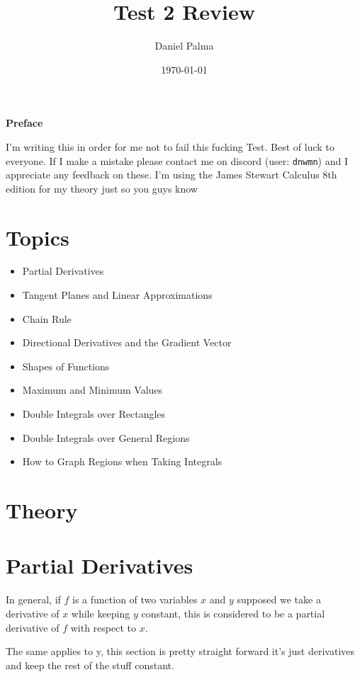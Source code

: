 \documentclass{article}
\author{Daniel Palma}
\date{\today}
\title{Test 2 Review}
\newcommand{\prefacename}{Preface}
\newenvironment{preface}{
    \vspace*{\stretch{2}}
    {\noindent \bfseries \Huge \prefacename}
    \begin{center}
        \thispagestyle{plain}
    \end{center}%
}
{\vspace*{\stretch{5}}}
\begin{document}
\maketitle
\newpage

\begin{preface}
    I'm writing this in order for me not to fail this fucking Test.
    Best of luck to everyone. If I make a mistake please contact me on discord (user: \verb|dnwmn|) and I appreciate any feedback on these. I'm using the James Stewart Calculus 8th edition for my theory just so you guys know 
\end{preface}

\tableofcontents
\newpage



\section*{Topics}

\begin{itemize}
    \item Partial Derivatives
    \item Tangent Planes and Linear Approximations
    \item Chain Rule
    \item Directional Derivatives and the Gradient Vector
    \item Shapes of Functions
    \item Maximum and Minimum Values
    \item Double Integrals over Rectangles
    \item Double Integrals over General Regions
    \item How to Graph Regions when Taking Integrals
\end{itemize}


\newpage
\section*{Theory}

\section{Partial Derivatives}

In general, if $f$ is a function of two variables $x$ and $y$ supposed we take a derivative of $x$ while keeping $y$ constant, this is considered to be a partial derivative of $f$ with respect to $x$.

The same applies to y, this section is pretty straight forward it's just derivatives and keep the rest of the stuff constant.
\end{document}
